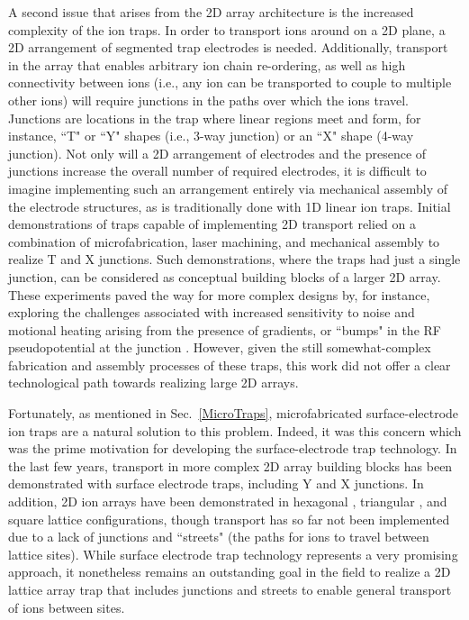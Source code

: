 \documentclass[%
12pt,
 amsmath,amssymb,
]{revtex4-2}
\begin{document}
A second issue that arises from the 2D array architecture is the increased complexity of the ion traps. In order to transport ions around on a 2D plane, a 2D arrangement of segmented trap electrodes is needed.  Additionally, transport in the array that enables arbitrary ion chain re-ordering, as well as high connectivity between ions (i.e., any ion can be transported to couple to multiple other ions) will require junctions in the paths over which the ions travel.  Junctions are locations in the trap where linear regions meet and form, for instance, ``T" or ``Y" shapes (i.e., 3-way junction) or an ``X" shape (4-way junction). Not only will a 2D arrangement of electrodes and the presence of junctions increase the overall number of required electrodes, it is difficult to imagine implementing such an arrangement entirely via mechanical assembly of the electrode structures, as is traditionally done with 1D linear ion traps.  Initial demonstrations of traps capable of implementing 2D transport relied on a combination of microfabrication, laser machining, and mechanical assembly to realize T \cite{HensingerTJunction2006} and X \cite{blakestad_junction_2009} junctions.  Such demonstrations, where the traps had just a single junction, can be considered as conceptual building blocks of a larger 2D array. These experiments paved the way for more complex designs by, for instance, exploring the challenges associated with increased sensitivity to noise and motional heating arising from the presence of gradients, or ``bumps" in the RF pseudopotential at the junction \cite{PhysRevA.78.063410}.   However, given the still somewhat-complex  fabrication and assembly processes of these traps, this work did not offer a clear technological path towards realizing large 2D arrays.

Fortunately, as mentioned in Sec.~\ref{MicroTraps}, microfabricated surface-electrode ion traps are a natural solution to this problem.  Indeed, it was this concern which was the prime motivation for developing the surface-electrode trap technology. In the last few years, transport in more complex 2D array building blocks has been demonstrated with surface electrode traps, including Y \cite{amini_racetrack, sandia_junction_2011} and X \cite{WrightXJunction2013} junctions.  In addition, 2D ion arrays have been demonstrated in hexagonal \cite{Sterling2014}, triangular \cite{Mielenz2016}, and square \cite{BruzewiczArrayLoading2016} lattice configurations, though transport has so far not been implemented due to a lack of junctions and ``streets" (the paths for ions to travel between lattice sites).  While surface electrode trap technology represents a very promising approach, it nonetheless remains an outstanding goal in the field to realize a 2D lattice array trap that includes junctions and streets to enable general transport of ions between sites.
\end{document}
